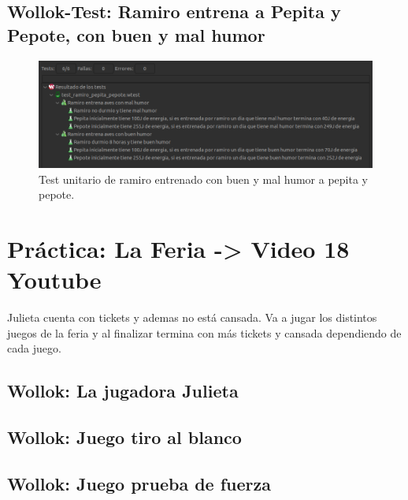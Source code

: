 \documentclass[11pt,a4paper]{article}
\begin{document}
\subsection{Wollok-Test: Ramiro entrena a Pepita y Pepote, con buen y mal humor}


\begin{figure}[H]
	\centering
	\includegraphics[scale=0.5]{figuras/test_ramiro_pepita_pepote.png}
    \caption{Test unitario de ramiro entrenado con buen y mal humor a pepita y pepote.}
    \label{fig:test ramiro entrena a pepita y pepote}
\end{figure}  

\section{Práctica: La Feria -> Video 18 Youtube}

Julieta cuenta con tickets y ademas no está cansada. Va a jugar los distintos juegos de la feria y al finalizar termina con más tickets y cansada dependiendo de cada juego.

\subsection{Wollok: La jugadora Julieta}


\subsection{Wollok: Juego tiro al blanco}


\subsection{Wollok: Juego prueba de fuerza}

\end{document}
